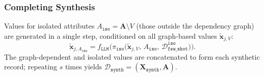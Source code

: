 \subsubsection{Completing Synthesis}

Values for isolated attributes $A_{\mathtt{iso}} = \mathbf{A} \setminus V$ (those outside the dependency graph) are generated in a single step, conditioned on all graph-based values $\tilde{\mathbf{x}}_{j, V}$:
\begin{equation}
\tilde{\mathbf{x}}_{j,A_{\mathtt{iso}}} = f_{\mathtt{LLM}}\!\Big(\pi_{\mathtt{iso}}\!\big(\tilde{\mathbf{x}}_{j,V},\, A_{\mathtt{iso}},\, \mathcal{D}_{\mathtt{few\_shot}}^{\mathtt{iso}}\big)\!\Big).
\end{equation}
The graph-dependent and isolated values are concatenated to form each synthetic record; repeating $s$ times yields $\mathcal{D}_{\mathtt{synth}} = (\mathbf{X}_{\mathtt{synth}}, \mathbf{A})$.

